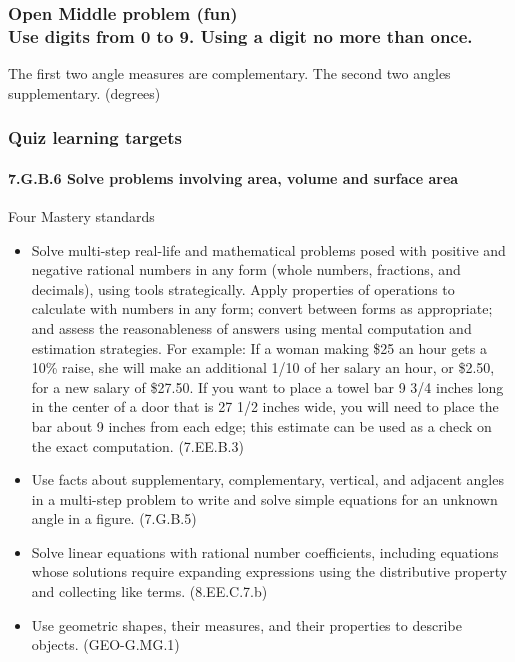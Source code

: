 \documentclass{beamer}
\begin{document}
  \frame
  {
    \frametitle{Open Middle problem (fun) \\
    Use digits from 0 to 9. Using a digit no more than once.}
      The first two angle measures are complementary. The second two angles supplementary. (degrees)\\[0.75cm]
         \vspace{5cm} 
  }

\frame
{
  \frametitle{Quiz learning targets}
  \framesubtitle{7.G.B.6 Solve problems involving area, volume and surface area}

  \begin{block}{Four Mastery standards}
    \begin{itemize}
    \item Solve multi-step real-life and mathematical problems posed with positive and negative rational numbers in any form (whole numbers, fractions, and decimals), using tools strategically. Apply properties of operations to calculate with numbers in any form; convert between forms as appropriate; and assess the reasonableness of answers using mental computation and estimation strategies. For example: If a woman making \$25 an hour gets a 10\% raise, she will make an additional 1/10 of her salary an hour, or \$2.50, for a new salary of \$27.50. If you want to place a towel bar 9 3/4 inches long in the center of a door that is 27 1/2 inches wide, you will need to place the bar about 9 inches from each edge; this estimate can be used as a check on the exact computation. (7.EE.B.3)
        
    \item Use facts about supplementary, complementary, vertical, and adjacent angles in a multi-step problem to write and solve simple equations for an unknown angle in a figure. (7.G.B.5)
    
    \item Solve linear equations with rational number coefficients, including equations whose solutions require expanding expressions using the distributive property and collecting like terms. (8.EE.C.7.b)
    
    \item Use geometric shapes, their measures, and their properties to describe objects. (GEO-G.MG.1)
    \end{itemize}
  \end{block}
}
  
\end{document}
